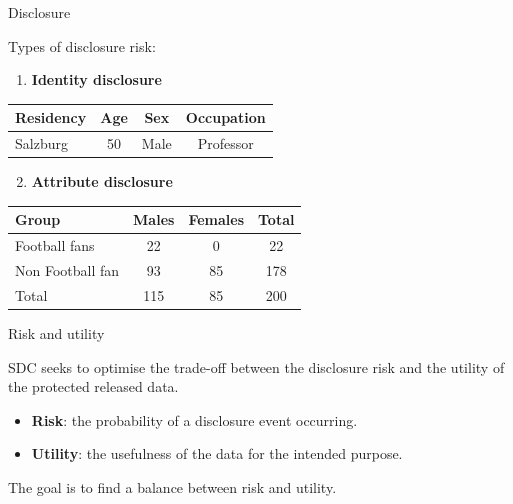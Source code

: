 \documentclass[
	aspectratio = 169
 ]{beamer}
\begin{document}
\begin{frame}{Disclosure}

Types of disclosure risk:

\begin{enumerate}
[(1)]
\tightlist
\item
  \textbf{Identity disclosure}
\end{enumerate}

\vspace{-2em}
\begin{table}[ht] 
\centering
\begin{tabular}[t]{lccc}
\toprule
Residency&Age&Sex&Occupation\\
\midrule
Salzburg&50&Male&Professor\\
\bottomrule
\end{tabular}
\end{table}

\begin{enumerate}
[(1)]
\setcounter{enumi}{1}
\tightlist
\item
  \textbf{Attribute disclosure}
\end{enumerate}

\vspace{-2em}
\begin{table}[ht]
\centering
\begin{tabular}[t]{lccc}
\toprule
Group&Males&Females&Total\\
\midrule
Football fans&22&0&22\\
Non Football fan&93&85&178\\
Total&115&85&200\\
\bottomrule
\end{tabular}
\end{table}
\end{frame}

\begin{frame}{Risk and utility}

SDC seeks to optimise the trade-off between the disclosure risk and the
utility of the protected released data.

\begin{itemize}
\item
  \textbf{Risk}: the probability of a disclosure event occurring.
\item
  \textbf{Utility}: the usefulness of the data for the intended purpose.
\end{itemize}

The goal is to find a balance between risk and utility.
\end{frame}
\end{document}
